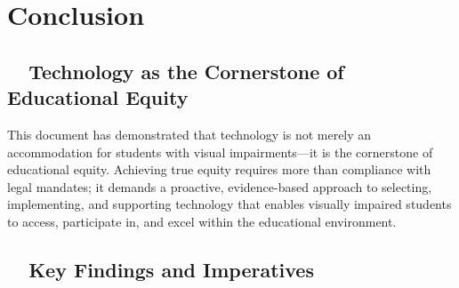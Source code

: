 \chapter{Conclusion}\label{main-conclusion}

\section{~~Technology as the Cornerstone of Educational Equity}
\label{sec:conclusion-technology-equity}

This document has demonstrated that technology is not merely an accommodation for students with visual impairments—it is the cornerstone of educational equity. Achieving true equity requires more than compliance with legal mandates; it demands a proactive, evidence-based approach to selecting, implementing, and supporting technology that enables visually impaired students to access, participate in, and excel within the educational environment. \supercite{IntroductionChapter1, Burgstahler2015, Kelly2011}

\section{~~Key Findings and Imperatives}
\label{sec:conclusion-key-findings}

